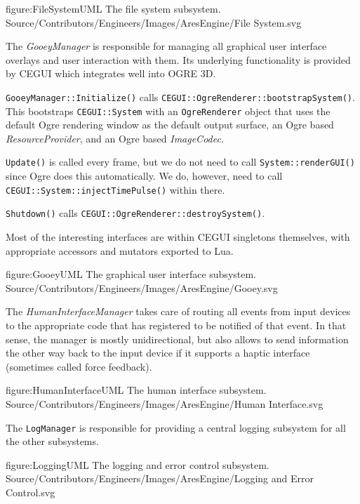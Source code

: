 \FullPageDiagram
    {figure:FileSystemUML}
    {The file system subsystem.}
    {Source/Contributors/Engineers/Images/AresEngine/File System.svg}

\page 
{}
The {\it GooeyManager} is responsible for managing all graphical user interface overlays and user interaction with them. Its underlying functionality is provided by CEGUI which integrates well into OGRE 3D.

{\tt GooeyManager::Initialize()} calls {\tt CEGUI::OgreRenderer::bootstrapSystem()}. This bootstraps {\tt CEGUI::System} with an {\tt OgreRenderer} object that uses the default Ogre rendering window as the default output surface, an Ogre based {\it ResourceProvider}, and an Ogre based {\it ImageCodec}.

{\tt Update()} is called every frame, but we do not need to call {\tt System::renderGUI()} since Ogre does this automatically. We do, however, need to call {\tt CEGUI::System::injectTimePulse()} within there.

{\tt Shutdown()} calls {\tt CEGUI::OgreRenderer::destroySystem()}.

Most of the interesting interfaces are within CEGUI singletons themselves, with appropriate accessors and mutators exported to Lua.

\FullPageDiagram
    {figure:GooeyUML}
    {The graphical user interface subsystem.}
    {Source/Contributors/Engineers/Images/AresEngine/Gooey.svg}

\page 
{}
The {\it HumanInterfaceManager} takes care of routing all events from input devices to the appropriate code that has registered to be notified of that event. In that sense, the manager is mostly unidirectional, but also allows to send information the other way back to the input device if it supports a haptic interface (sometimes called force feedback).

\FullPageDiagram
    {figure:HumanInterfaceUML}
    {The human interface subsystem.}
    {Source/Contributors/Engineers/Images/AresEngine/Human Interface.svg}

\page 
{}
The {\tt LogManager} is responsible for providing a central logging subsystem for all the other subsystems.

\FullPageDiagram
    {figure:LoggingUML}
    {The logging and error control subsystem.}
    {Source/Contributors/Engineers/Images/AresEngine/Logging and Error Control.svg}
    
